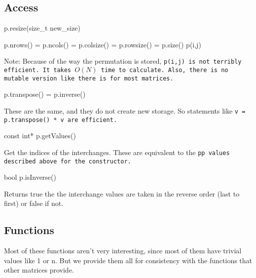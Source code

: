 \subsection{Access}
\label{Permutation_Access}

\begin{tmvcode}
p.resize(size_t new_size)
\end{tmvcode}

\begin{tmvcode}
p.nrows() = p.ncols() = p.colsize() = p.rowsize() = p.size()
p(i,j)
\end{tmvcode}
Note: Because of the way the permutation is stored, \tt{p(i,j)} is not
terribly efficient.  It takes $O(N)$ time to calculate.  Also, there is no
mutable version like there is for most matrices.

\begin{tmvcode}
p.transpose() = p.inverse()
\end{tmvcode}
These are the same, and they do not create new storage.  So statements like
\tt{v = p.transpose() * v} are efficient.

\begin{tmvcode}
const int* p.getValues()
\end{tmvcode}
Get the indices of the interchanges.  These are equivalent to the \tt{pp} values
described above for the constructor.

\begin{tmvcode}
bool p.isInverse()
\end{tmvcode}
Returns true the the interchange values are taken in the reverse order (last to first)
or false if not.
\vspace{12pt}

\subsection{Functions}
\label{Permutation_Functions}

Most of these functions aren't very interesting, since most of them have 
trivial values like 1 or n.  But we provide them all for consistency with the 
functions that other matrices provide.

